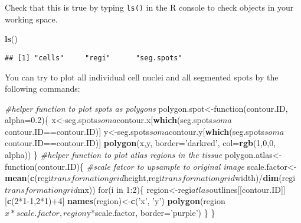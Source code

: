 \documentclass[]{book}
\newenvironment{Shaded}{\begin{snugshade}}{\end{snugshade}}
\newcommand{\KeywordTok}[1]{\textcolor[rgb]{0.13,0.29,0.53}{\textbf{{#1}}}}
\newcommand{\DataTypeTok}[1]{\textcolor[rgb]{0.13,0.29,0.53}{{#1}}}
\newcommand{\DecValTok}[1]{\textcolor[rgb]{0.00,0.00,0.81}{{#1}}}
\newcommand{\FloatTok}[1]{\textcolor[rgb]{0.00,0.00,0.81}{{#1}}}
\newcommand{\StringTok}[1]{\textcolor[rgb]{0.31,0.60,0.02}{{#1}}}
\newcommand{\CommentTok}[1]{\textcolor[rgb]{0.56,0.35,0.01}{\textit{{#1}}}}
\newcommand{\NormalTok}[1]{{#1}}
\theoremstyle{definition}
\theoremstyle{definition}
\theoremstyle{remark}
\begin{document}
Check that this is true by typing \texttt{ls()} in the R console to
check objects in your working space.

\begin{Shaded}
\begin{Highlighting}[]
\KeywordTok{ls}\NormalTok{()}
\end{Highlighting}
\end{Shaded}

\begin{verbatim}
## [1] "cells"     "regi"      "seg.spots"
\end{verbatim}

You can try to plot all individual cell nuclei and all segmented spots
by the following commands:

\begin{Shaded}
\begin{Highlighting}[]
\CommentTok{#helper function to plot spots as polygons}
\NormalTok{polygon.spot<-function(contour.ID, }\DataTypeTok{alpha=}\FloatTok{0.2}\NormalTok{)\{}
  \NormalTok{x<-seg.spots$soma$contour.x[}\KeywordTok{which}\NormalTok{(seg.spots$soma$contour.ID==contour.ID)]}
  \NormalTok{y<-seg.spots$soma$contour.y[}\KeywordTok{which}\NormalTok{(seg.spots$soma$contour.ID==contour.ID)]}
  \KeywordTok{polygon}\NormalTok{(x,y, }\DataTypeTok{border=}\StringTok{'darkred'}\NormalTok{, }\DataTypeTok{col=}\KeywordTok{rgb}\NormalTok{(}\DecValTok{1}\NormalTok{,}\DecValTok{0}\NormalTok{,}\DecValTok{0}\NormalTok{, alpha))}
\NormalTok{\}}
\CommentTok{#helper function to plot atlas regions in the tissue}
\NormalTok{polygon.atlas<-function(contour.ID)\{}
  \CommentTok{#scale fatcor to upsample to original image}
  \NormalTok{scale.factor<-}\KeywordTok{mean}\NormalTok{(}\KeywordTok{c}\NormalTok{(regi$transformationgrid$height,regi$transformationgrid$width)/}\KeywordTok{dim}\NormalTok{(regi$transformationgrid$mx))}
  \NormalTok{for(i in }\DecValTok{1}\NormalTok{:}\DecValTok{2}\NormalTok{)\{}
    \NormalTok{region<-regi$atlas$outlines[[contour.ID]][}\KeywordTok{c}\NormalTok{(}\DecValTok{2}\NormalTok{*}\DecValTok{1-1}\NormalTok{,}\DecValTok{2}\NormalTok{*}\DecValTok{1}\NormalTok{)+}\DecValTok{4}\NormalTok{]}
    \KeywordTok{names}\NormalTok{(region)<-}\KeywordTok{c}\NormalTok{(}\StringTok{'x'}\NormalTok{, }\StringTok{'y'}\NormalTok{)}
    \KeywordTok{polygon}\NormalTok{(region$x*scale.factor, region$y*scale.factor, }\DataTypeTok{border=}\StringTok{'purple'}\NormalTok{)}
  \NormalTok{\}}
\NormalTok{\}}
\end{Highlighting}
\end{Shaded}
\end{document}
